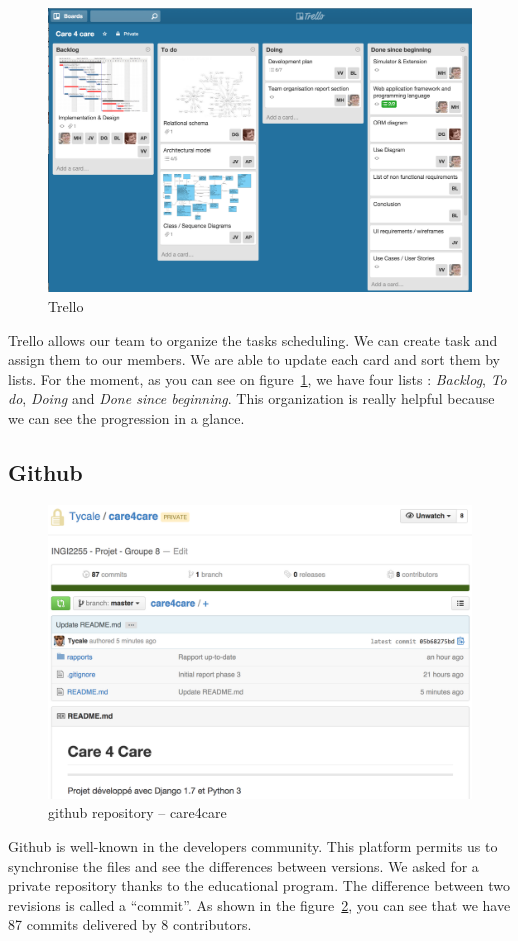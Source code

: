 \documentclass[11pt, a4paper]{article}   	%
\newcommand{\tit}[1]{\textit{#1}}
\begin{document}
\begin{figure}[!ht]
   \includegraphics[width=\textwidth]{trello.png}
   \caption{\label{trello} Trello}
\end{figure}

Trello allows our team to organize the tasks scheduling.
We can create task and assign them to our members.
We are able to update each card and sort them by lists.
For the moment, as you can see on figure~\ref{trello}, we have four lists : \tit{Backlog}, \tit{To do}, \tit{Doing} and \tit{Done since beginning}.
This organization is really helpful because we can see the progression in a glance.

\subsection{Github} 

\begin{figure}[!ht]
   \includegraphics[width=\textwidth]{github.png}
   \caption{\label{github} github repository – care4care}
\end{figure}

Github is well-known in the developers community.
This platform permits us to synchronise the files and see the differences between versions.
We asked for a private repository thanks to the educational program.
The difference between two revisions is called a \enquote{commit}.
As shown in the figure~\ref{github}, you can see that we have 87 commits delivered by 8 contributors.
\end{document}
